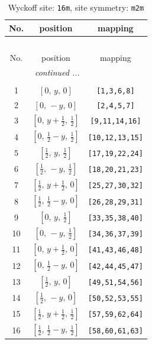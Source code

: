 \documentclass[fleqn,8pt]{jsarticle}
\begin{document}
\renewcommand{\arraystretch}{1.2}
\begin{longtable}{ccc}
\caption{Wyckoff site: {\tt 16m}, site symmetry: {\tt m2m}}
 \\
 \hline \hline
No. & position & mapping \\ \hline \endfirsthead

\multicolumn{2}{l}{\tablename\ \thetable{}} \\
 \hline \hline
No. & position & mapping \\ \hline \endhead

 \hline \hline
\multicolumn{2}{r}{\footnotesize\it continued ...} \\ \endfoot

 \hline \hline
\multicolumn{2}{r}{} \\ \endlastfoot

1 & $\left[ 0,\, y,\, 0 \right]$ & {\tt [1,3,6,8]} \\ \hline
2 & $\left[ 0,\, - y,\, 0 \right]$ & {\tt [2,4,5,7]} \\ \hline
3 & $\left[ 0,\, y + \frac{1}{2},\, \frac{1}{2} \right]$ & {\tt [9,11,14,16]} \\ \hline
4 & $\left[ 0,\, \frac{1}{2} - y,\, \frac{1}{2} \right]$ & {\tt [10,12,13,15]} \\ \hline
5 & $\left[ \frac{1}{2},\, y,\, \frac{1}{2} \right]$ & {\tt [17,19,22,24]} \\ \hline
6 & $\left[ \frac{1}{2},\, - y,\, \frac{1}{2} \right]$ & {\tt [18,20,21,23]} \\ \hline
7 & $\left[ \frac{1}{2},\, y + \frac{1}{2},\, 0 \right]$ & {\tt [25,27,30,32]} \\ \hline
8 & $\left[ \frac{1}{2},\, \frac{1}{2} - y,\, 0 \right]$ & {\tt [26,28,29,31]} \\ \hline
9 & $\left[ 0,\, y,\, \frac{1}{2} \right]$ & {\tt [33,35,38,40]} \\ \hline
10 & $\left[ 0,\, - y,\, \frac{1}{2} \right]$ & {\tt [34,36,37,39]} \\ \hline
11 & $\left[ 0,\, y + \frac{1}{2},\, 0 \right]$ & {\tt [41,43,46,48]} \\ \hline
12 & $\left[ 0,\, \frac{1}{2} - y,\, 0 \right]$ & {\tt [42,44,45,47]} \\ \hline
13 & $\left[ \frac{1}{2},\, y,\, 0 \right]$ & {\tt [49,51,54,56]} \\ \hline
14 & $\left[ \frac{1}{2},\, - y,\, 0 \right]$ & {\tt [50,52,53,55]} \\ \hline
15 & $\left[ \frac{1}{2},\, y + \frac{1}{2},\, \frac{1}{2} \right]$ & {\tt [57,59,62,64]} \\ \hline
16 & $\left[ \frac{1}{2},\, \frac{1}{2} - y,\, \frac{1}{2} \right]$ & {\tt [58,60,61,63]} \\
\end{longtable}
\end{document}
